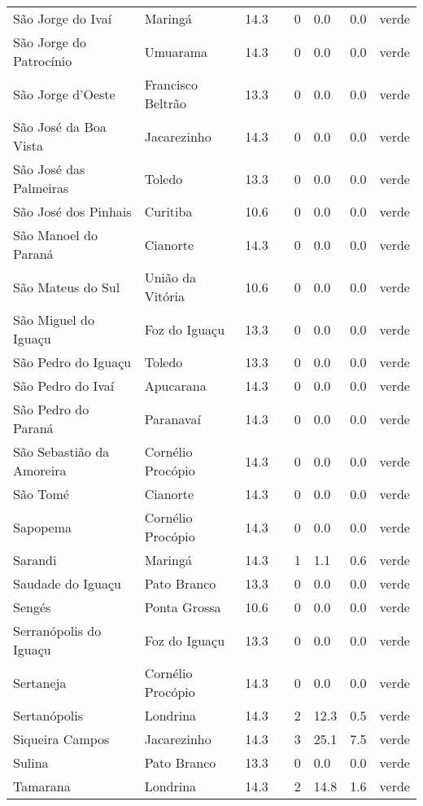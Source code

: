 \begin{longtable}{l|lllllll}
  São Jorge do Ivaí & Maringá & 14.3 &  & 0 & 0.0 & 0.0 & verde \\ 
  São Jorge do Patrocínio & Umuarama & 14.3 &  & 0 & 0.0 & 0.0 & verde \\ 
  São Jorge d'Oeste & Francisco Beltrão & 13.3 &  & 0 & 0.0 & 0.0 & verde \\ 
  São José da Boa Vista & Jacarezinho & 14.3 &  & 0 & 0.0 & 0.0 & verde \\ 
  São José das Palmeiras & Toledo & 13.3 &  & 0 & 0.0 & 0.0 & verde \\ 
  São José dos Pinhais & Curitiba & 10.6 &  & 0 & 0.0 & 0.0 & verde \\ 
  São Manoel do Paraná & Cianorte & 14.3 &  & 0 & 0.0 & 0.0 & verde \\ 
  São Mateus do Sul & União da Vitória & 10.6 &  & 0 & 0.0 & 0.0 & verde \\ 
  São Miguel do Iguaçu & Foz do Iguaçu & 13.3 &  & 0 & 0.0 & 0.0 & verde \\ 
  São Pedro do Iguaçu & Toledo & 13.3 &  & 0 & 0.0 & 0.0 & verde \\ 
  São Pedro do Ivaí & Apucarana & 14.3 &  & 0 & 0.0 & 0.0 & verde \\ 
  São Pedro do Paraná & Paranavaí & 14.3 &  & 0 & 0.0 & 0.0 & verde \\ 
  São Sebastião da Amoreira & Cornélio Procópio & 14.3 &  & 0 & 0.0 & 0.0 & verde \\ 
  São Tomé & Cianorte & 14.3 &  & 0 & 0.0 & 0.0 & verde \\ 
  Sapopema & Cornélio Procópio & 14.3 &  & 0 & 0.0 & 0.0 & verde \\ 
  Sarandi & Maringá & 14.3 &  & 1 & 1.1 & 0.6 & verde \\ 
  Saudade do Iguaçu & Pato Branco & 13.3 &  & 0 & 0.0 & 0.0 & verde \\ 
  Sengés & Ponta Grossa & 10.6 &  & 0 & 0.0 & 0.0 & verde \\ 
  Serranópolis do Iguaçu & Foz do Iguaçu & 13.3 &  & 0 & 0.0 & 0.0 & verde \\ 
  Sertaneja & Cornélio Procópio & 14.3 &  & 0 & 0.0 & 0.0 & verde \\ 
  Sertanópolis & Londrina & 14.3 &  & 2 & 12.3 & 0.5 & verde \\ 
  Siqueira Campos & Jacarezinho & 14.3 &  & 3 & 25.1 & 7.5 & verde \\ 
  Sulina & Pato Branco & 13.3 &  & 0 & 0.0 & 0.0 & verde \\ 
  Tamarana & Londrina & 14.3 &  & 2 & 14.8 & 1.6 & verde \\ 

\end{longtable}
